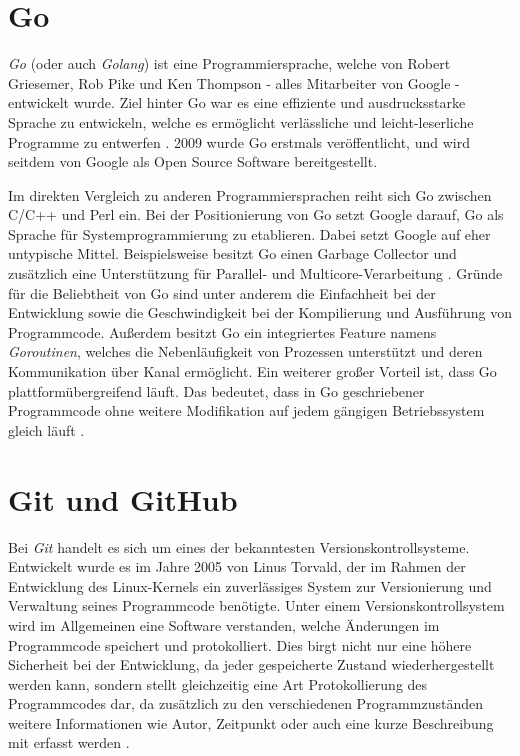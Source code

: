 \section{Go}
\textit{Go} (oder auch \textit{Golang}) ist eine Programmiersprache, welche von
Robert Griesemer, Rob Pike und Ken Thompson - alles Mitarbeiter von Google -
entwickelt wurde. Ziel hinter Go war es eine effiziente und ausdrucksstarke
Sprache zu entwickeln, welche es ermöglicht verlässliche und leicht-leserliche
Programme zu entwerfen \autocite{donovan_kernighan_2016}.
2009 wurde Go erstmals veröffentlicht, und wird seitdem von Google als Open Source
Software bereitgestellt. \newline

Im direkten Vergleich zu anderen Programmiersprachen reiht sich Go zwischen
C/C++ und Perl ein. Bei der Positionierung von Go setzt Google darauf, Go als
Sprache für Systemprogrammierung zu etablieren. Dabei setzt Google auf eher
untypische Mittel. Beispielsweise besitzt Go einen Garbage Collector und zusätzlich eine
Unterstützung für Parallel- und Multicore-Verarbeitung
\autocite{feike_blass_2012}. \newline 
Gründe für die Beliebtheit von Go sind unter anderem die Einfachheit bei der
Entwicklung sowie die Geschwindigkeit bei der Kompilierung und
Ausführung von Programmcode. Außerdem besitzt Go ein integriertes Feature namens
\textit{Goroutinen}, welches die Nebenläufigkeit von Prozessen unterstützt und
deren Kommunikation über Kanal ermöglicht. 
Ein weiterer großer Vorteil ist, dass Go plattformübergreifend läuft. Das bedeutet,
dass in Go geschriebener Programmcode ohne weitere Modifikation auf jedem
gängigen Betriebssystem gleich läuft \autocite{donovan_kernighan_2016}.


\section{Git und GitHub}
Bei \textit{Git} handelt es sich um eines der bekanntesten
Versionskontrollsysteme. Entwickelt wurde es im Jahre 2005 von Linus Torvald,
der im Rahmen der Entwicklung des Linux-Kernels ein zuverlässiges System zur
Versionierung und Verwaltung seines Programmcode benötigte. Unter einem
Versionskontrollsystem wird im Allgemeinen eine Software verstanden, welche
Änderungen im Programmcode speichert und protokolliert. Dies birgt nicht nur
eine höhere Sicherheit bei der Entwicklung, da jeder gespeicherte Zustand
wiederhergestellt werden kann, sondern stellt gleichzeitig eine Art
Protokollierung des Programmcodes dar, da zusätzlich zu den verschiedenen
Programmzuständen weitere Informationen wie Autor, Zeitpunkt oder auch eine
kurze Beschreibung mit erfasst werden \autocite{preissel_stachmann_2017}. \hfill
\break 

